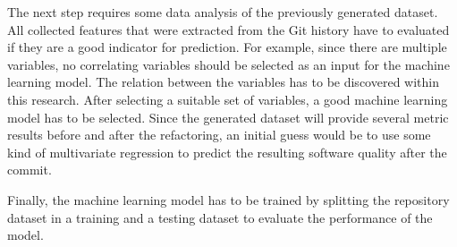 \documentclass{article}
\begin{document}
The next step requires some data analysis of the previously generated dataset. All collected features that were extracted from the Git history have to evaluated if they are a good indicator for prediction. For example, since there are multiple variables, no correlating variables should be selected as an input for the machine learning model. The relation between the variables has to be discovered within this research.
After selecting a suitable set of variables, a good machine learning model has to be selected. Since the generated dataset will provide several metric results before and after the refactoring, an initial guess would be to use some kind of multivariate regression to predict the resulting software quality after the commit.

Finally, the machine learning model has to be trained by splitting the repository dataset in a training and a testing dataset to evaluate the performance of the model.




\end{document}
